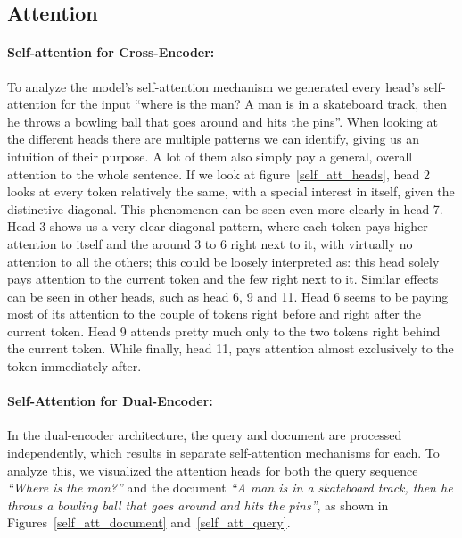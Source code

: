 \documentclass[runningheads]{llncs}
\begin{document}
\clearpage

\subsection{Attention}


\paragraph{Self-attention for Cross-Encoder:} To analyze the model's self-attention mechanism we generated every head's self-attention for the input ``where is the man? A man is in a skateboard track, then he throws a bowling ball that goes around and hits the pins''. When looking at the different heads there are multiple patterns we can identify, giving us an intuition of their purpose. A lot of them also simply pay a general, overall attention to the whole sentence. If we look at figure~\ref{self_att_heads}, head 2 looks at every token relatively the same, with a special interest in itself, given the distinctive diagonal. This phenomenon can be seen even more clearly in head 7. Head 3 shows us a very clear diagonal pattern, where each token pays higher attention to itself and the around 3 to 6 right next to it, with virtually no attention to all the others; this could be loosely interpreted as: this head solely pays attention to the current token and the few right next to it. Similar effects can be seen in other heads, such as head 6, 9 and 11. Head 6 seems to be paying most of its attention to the couple of tokens right before and right after the current token. Head 9 attends pretty much only to the two tokens right behind the current token. While finally, head 11, pays attention almost exclusively to the token immediately after.

\vspace{2\baselineskip plus 0.5\baselineskip minus 0.5\baselineskip} %

\paragraph{Self-Attention for Dual-Encoder:} 
In the dual-encoder architecture, the query and document are processed independently, which results in separate self-attention mechanisms for each. To analyze this, we visualized the attention heads for both the query sequence \textit{``Where is the man?''} and the document \textit{``A man is in a skateboard track, then he throws a bowling ball that goes around and hits the pins''}, as shown in Figures~\ref{self_att_document} and~\ref{self_att_query}.
\end{document}
